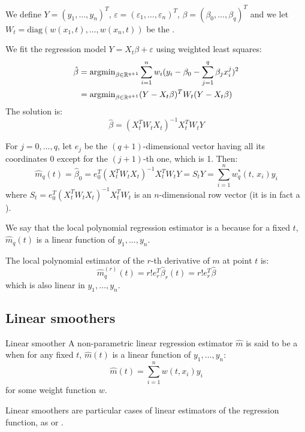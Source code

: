 We define $Y = (y_1, \ldots, y_n)^T,\, \varepsilon = (\varepsilon_1, \ldots, \varepsilon_n)^T,\,
	\beta = (\beta_0, \ldots, \beta_q)^T$ and we let $W_t = \text{diag}(w(x_1, t), \ldots, w(x_n,t))$
be the .

We fit the regression model $Y = X_t\beta + \varepsilon$ using weighted least squares:
\begin{align*}
	\hat\beta & = \operatorname{argmin}_{\beta\in\mathbb{R}^{q+1}} \sum_{i=1}^n w_i(y_i - \beta_0 - \sum_{j=1}^q \beta_j x_i^j)^2 \\
	          & = \operatorname{argmin}_{\beta\in\mathbb{R}^{q+1}} (Y - X_t\beta)^T W_t (Y - X_t\beta)
\end{align*}
The solution is:
\begin{equation*}
	\hat\beta = (X_t^T W_t X_t)^{-1} X_t^T W_t Y
\end{equation*}

For $j=0,\ldots,q$, let $e_j$ be the $(q+1)$-dimensional vector
having all its coordinates 0 except for the $(j+1)$-th one, which is 1.
Then:
\begin{equation*}
	\hat m_q(t) = \hat \beta_0 = e_0^T (X_t^T W_t X_t)^{-1} X_t^T W_t Y = S_tY = \sum_{i=1}^n w^*_q(t,\, x_i) y_i
\end{equation*}
where $S_t = e_0^T (X_t^T W_t X_t)^{-1} X_t^T W_t$ is an $n$-dimensional row vector (it
is in fact a ).

\begin{note}
	We say that the local polynomial regression estimator is a 
	because for a fixed $t$, $\hat m_q(t)$ is a linear function of $y_1,\ldots,y_n$.
\end{note}

The local polynomial estimator of the $r$-th derivative of $m$ at point $t$ is:
\begin{equation*}
	\hat m_q^{(r)}(t) = r!e_r^T\hat\beta_r(t) = r!e_r^T\hat\beta
\end{equation*}
which is also linear in $y_1,\ldots,y_n$.

\subsection{Linear smoothers}

\begin{definition}{Linear smoother}{}
	A non-parametric linear regression estimator $\hat m$ is said to be
	a  when for any fixed $t$, $\hat m(t)$ is a linear function of
	$y_1,\ldots,y_n$:
	\begin{equation*}
		\hat m(t) = \sum_{i=1}^n w(t, x_i) y_i
	\end{equation*}
	for some weight function $w$.
	\tcblower
	\begin{note}
		Linear smoothers are particular cases of linear estimators of the regression
		function, as  or .
	\end{note}
\end{definition}

